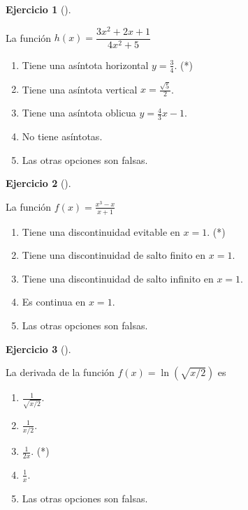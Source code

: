 \documentclass[
  a4paper,
]{scrreport}
\theoremstyle{definition}
\newtheorem{exercise}{Ejercicio}[chapter]
\theoremstyle{remark}
\begin{document}
\begin{exercise}[]\protect\hypertarget{exr-19}{}\label{exr-19}

La función \(h(x)=\dfrac{3x^2+2x+1}{4x^2+5}\)

\begin{enumerate}
\def\labelenumi{\alph{enumi}.}
\item
  Tiene una asíntota horizontal \(y=\frac{3}{4}\). (*)
\item
  Tiene una asíntota vertical \(x=\frac{\sqrt{5}}{2}\).
\item
  Tiene una asíntota oblicua \(y=\frac{4}{3}x-1\).
\item
  No tiene asíntotas.
\item
  Las otras opciones son falsas.
\end{enumerate}

\end{exercise}

\begin{exercise}[]\protect\hypertarget{exr-20}{}\label{exr-20}

La función \(f(x)=\frac{x^3-x}{x+1}\)

\begin{enumerate}
\def\labelenumi{\alph{enumi}.}
\item
  Tiene una discontinuidad evitable en \(x=1\). (*)
\item
  Tiene una discontinuidad de salto finito en \(x=1\).
\item
  Tiene una discontinuidad de salto infinito en \(x=1\).
\item
  Es continua en \(x=1\).
\item
  Las otras opciones son falsas.
\end{enumerate}

\end{exercise}

\begin{exercise}[]\protect\hypertarget{exr-21}{}\label{exr-21}

La derivada de la función \(f(x)=\ln(\sqrt{x/2})\) es

\begin{enumerate}
\def\labelenumi{\alph{enumi}.}
\item
  \(\frac{1}{\sqrt{x/2}}\).
\item
  \(\frac{1}{x/2}\).
\item
  \(\frac{1}{2x}\). (*)
\item
  \(\frac{1}{x}\).
\item
  Las otras opciones son falsas.
\end{enumerate}

\end{exercise}
\end{document}
